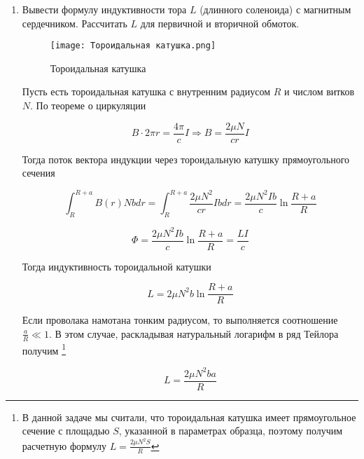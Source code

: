 \begin{enumerate}
	\item Вывести формулу индуктивности тора $L$ (длинного соленоида) с магнитным сердечником. 
	Рассчитать $L$ для первичной и вторичной обмоток.

	\begin{figure}
		\centering
		\texttt{[image: Тороидальная катушка.png]}
		\caption{Тороидальная катушка}
	\end{figure}

	Пусть есть тороидальная катушка с внутренним радиусом $R$ и числом витков $N$. По теореме о циркуляции
     
    \begin{equation}
        B \cdot 2 \pi r = \frac{4 \pi}{c} I \Rightarrow B = \frac{2 \mu N}{cr} I
    \end{equation}
    
    Тогда поток вектора индукции через тороидальную катушку прямоугольного сечения
    
    \begin{equation}
        \int_R^{R+a} B(r) N b dr = \int_R^{R+a} \frac{2 \mu N^2}{cr} I b dr = \frac{2 \mu N^2 I b}{c} \ln \frac{R + a}{R} 
    \end{equation}
    
    \begin{equation}
        \Phi = \frac{2 \mu N^2 I b}{c} \ln \frac{R + a}{R} = \frac{L I}{c}
    \end{equation}
    
    Тогда индуктивность тороидальной катушки
    
    \begin{equation}
        L = 2 \mu N^2 b \ln \frac{R + a}{R}
    \end{equation}
    
    Если проволака намотана тонким радиусом, то выполняется соотношение $\frac{a}{R} \ll 1$. 
	В этом случае, раскладывая натуральный логарифм в ряд Тейлора получим \footnote{В данной задаче мы считали,
	что тороидальная катушка имеет прямоугольное сечение с площадью $S$, указанной в параметрах образца, поэтому получим расчетную формулу
	$L = \frac{2 \mu N^2 S}{R}$}
    
    \begin{equation}
        L = \frac{2 \mu N^2 b a}{R}
    \end{equation}


\end{enumerate}
